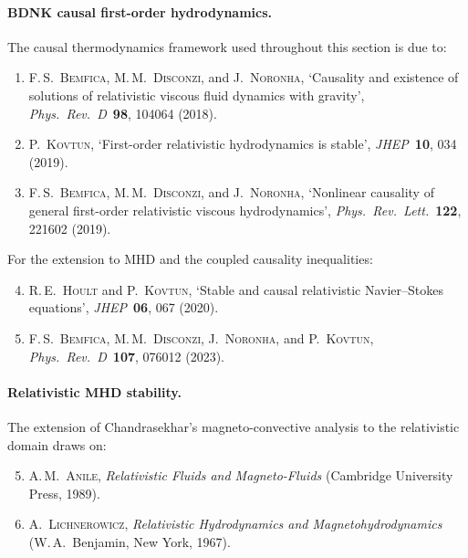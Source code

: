 \paragraph{BDNK causal first-order hydrodynamics.}
The causal thermodynamics framework used throughout this section is due to:
\begin{enumerate}
  \item F.\,S.~\textsc{Bemfica}, M.\,M.~\textsc{Disconzi}, and
    J.~\textsc{Noronha}, `Causality and existence of solutions of
    relativistic viscous fluid dynamics with gravity',
    \textit{Phys.\ Rev.\ D}\ \textbf{98}, 104064 (2018).
  \item P.~\textsc{Kovtun}, `First-order relativistic hydrodynamics is
    stable', \textit{JHEP}\ \textbf{10}, 034 (2019).
  \item F.\,S.~\textsc{Bemfica}, M.\,M.~\textsc{Disconzi}, and
    J.~\textsc{Noronha}, `Nonlinear causality of general first-order
    relativistic viscous hydrodynamics',
    \textit{Phys.\ Rev.\ Lett.}\ \textbf{122}, 221602 (2019).
\end{enumerate}
For the extension to MHD and the coupled causality inequalities:
\begin{enumerate}\setcounter{enumi}{3}
  \item R.\,E.~\textsc{Hoult} and P.~\textsc{Kovtun}, `Stable and causal
    relativistic Navier--Stokes equations',
    \textit{JHEP}\ \textbf{06}, 067 (2020).
  \item F.\,S.~\textsc{Bemfica}, M.\,M.~\textsc{Disconzi},
    J.~\textsc{Noronha}, and P.~\textsc{Kovtun},
    \textit{Phys.\ Rev.\ D}\ \textbf{107}, 076012 (2023).
\end{enumerate}

\paragraph{Relativistic MHD stability.}
The extension of Chandrasekhar's magneto-convective analysis to the
relativistic domain draws on:
\begin{enumerate}\setcounter{enumi}{4}
  \item A.\,M.~\textsc{Anile}, \textit{Relativistic Fluids and Magneto-Fluids}
    (Cambridge University Press, 1989).
  \item A.~\textsc{Lichnerowicz}, \textit{Relativistic Hydrodynamics and
    Magnetohydrodynamics} (W.\,A.\ Benjamin, New York, 1967).
\end{enumerate}

